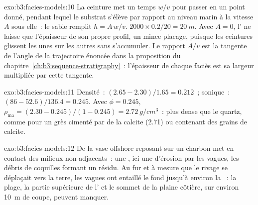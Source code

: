 \begin{solution}{exo:b3:facies-models:10}
La ceinture met un temps $w/v$ pour passer en un point donné, pendant lequel le substrat
s'élève par rapport au niveau marin à la vitesse $A$ sous elle~: le sable remplit $h = A\,w/v$.
$2000\times0.2/20 = \qty{20}{m}$. Avec $A = 0$, l' ne laisse que
l'épaisseur de son propre profil, un mince placage, puisque les ceintures glissent
les unes sur les autres sans s'accumuler. Le rapport $A/v$ est la tangente de l'angle de
la trajectoire énoncée dans la proposition du chapitre~\ref{ch:b3:sequence-stratigraphy}~:
l'épaisseur de chaque faciès est sa largeur multipliée par cette tangente.
\end{solution}

\begin{solution}{exo:b3:facies-models:11}
Densité~: $(2.65 - 2.30)/1.65 = 0.212$~; sonique~: $(86 - 52.6)/136.4 = 0.245$.
Avec $\phi = 0.245$, $\rho_{\mathrm{ma}} = (2.30 - 0.245)/(1 - 0.245) =
\qty{2.72}{g/cm^3}$~: plus dense que le quartz, comme pour un grès cimenté par
de la calcite (2.71) ou contenant des grains de calcite.
\end{solution}

\begin{solution}{exo:b3:facies-models:12}
De la vase offshore reposant sur un charbon met en contact des milieux non adjacents~: une
, ici une  d'érosion par les vagues, les débris de coquilles
formant un résidu. Au fur et à mesure que le rivage se déplaçait vers la terre, les vagues ont entaillé le fond
jusqu'à environ la ~: la plage, la partie supérieure de l' et
le sommet de la plaine côtière, sur environ \qty{10}{m} de coupe, peuvent
manquer.
\end{solution}

